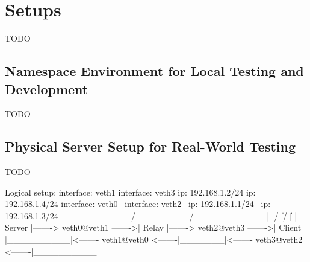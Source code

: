 \section{Setups}\label{sec:setups}
TODO

\subsection{Namespace Environment for Local Testing and Development}\label{subsec:namespace_environment}
TODO

\subsection{Physical Server Setup for Real-World Testing}\label{subsec:physical_server_setup}
TODO




\begin{myverbatim}

Logical setup:
                                interface: veth1                        interface: veth3
                                ip: 192.168.1.2/24                      ip: 192.168.1.4/24
              interface: veth0       \              interface: veth2       \
              ip: 192.168.1.1/24      \             ip: 192.168.1.3/24      \
 __________  /                         \  _______  /                         \  __________ 
|          |/                           \|       |/                           \|          |
|  Server  |-------> veth0@veth1 ------->| Relay |-------> veth2@veth3 ------->|  Client  |
|__________|<------- veth1@veth0 <-------|_______|<------- veth3@veth2 <-------|__________|

\end{myverbatim}


